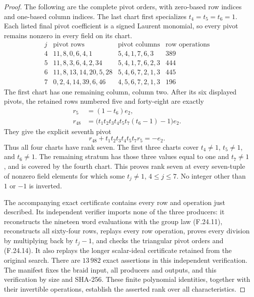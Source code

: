 \begin{proof}
The following are the complete pivot orders, with
zero-based row indices and one-based column indices.
The last chart first specializes $t_4=t_5=t_6=1$.
Each listed final pivot coefficient is a signed Laurent
monomial, so every pivot remains nonzero in every field
on its chart.
\[
\begin{array}{c|l|l|r}
 j&\text{pivot rows}&\text{pivot columns}&\text{row operations}\\\hline
 4&11,8,0,6,4,1&5,4,1,7,6,3&389\\
 5&11,8,3,6,4,2,34&5,4,1,7,6,2,3&444\\
 6&11,8,13,14,20,5,28&5,4,6,7,2,1,3&445\\
 7&0,2,4,14,39,6,46&4,5,6,7,2,1,3&196
\end{array}                                                     \tag{F.24.13}
\]
The first chart has one remaining column, column two.
After its six displayed pivots, the retained rows
numbered five and forty-eight are exactly
\[
 \begin{aligned}
 r_5&=(1-t_6)e_2,\\
 r_{48}&=\bigl(t_1t_2t_3t_4t_5t_7(t_6-1)-1\bigr)e_2.
 \end{aligned}
\]
They give the explicit seventh pivot
\[
           r_{48}+t_1t_2t_3t_4t_5t_7 r_5=-e_2 .              \tag{F.24.14}
\]
Thus all four charts have rank seven. The first three
charts cover $t_4\ne1$, $t_5\ne1$, and $t_6\ne1$.
The remaining stratum has those three values equal to
one and $t_7\ne1$, and is covered by the fourth chart.
This proves rank seven at every seven-tuple of nonzero
field elements for which some $t_j\ne1$, $4\leq j\leq7$.
No integer other than $1$ or $-1$ is inverted.

The accompanying exact certificate contains every row
and operation just described. Its independent verifier
imports none of the three producers: it reconstructs
the nineteen word evaluations with the group law
(F.24.11), reconstructs all sixty-four rows, replays
every row operation, proves every division by multiplying
back by $t_j-1$, and checks the triangular pivot orders
and (F.24.14). It also replays the longer scalar-ideal
certificate retained from the original search. There
are $13\,982$ exact assertions in this independent
verification. The manifest fixes the braid input,
all producers and outputs, and this verification by
size and SHA-256. These finite polynomial identities,
together with their invertible operations, establish
the asserted rank over all characteristics.


\end{proof}
